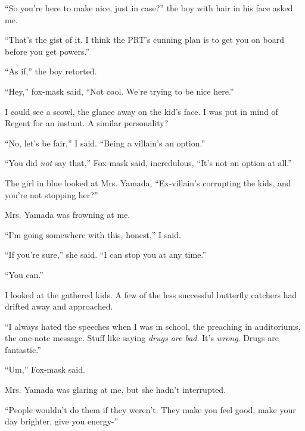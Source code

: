 ``So you're here to make nice, just in case?'' the boy with hair in his face asked me.



``That's the gist of it.  I think the PRT's cunning plan is to get you on board before you get powers.''



``As if,'' the boy retorted.



``Hey,'' fox-mask said, ``Not cool.  We're trying to be nice here.''



I could see a scowl, the glance away on the kid's face.  I was put in mind of Regent for an instant.  A similar personality?



``No, let's be fair,'' I said.  ``Being a villain's an option.''



``You did\emph{ not }say that,'' Fox-mask said, incredulous, ``It's not an option at all.''



The girl in blue looked at Mrs. Yamada, ``Ex-villain's corrupting the kids, and you're not stopping her?''



Mrs. Yamada was frowning at me.



``I'm going somewhere with this, honest,'' I said.



``If you're sure,'' she said.  ``I can stop you at any time.''



``You can.''



I looked at the gathered kids.  A few of the less successful butterfly catchers had drifted away and approached.



``I always hated the speeches when I was in school, the preaching in auditoriums, the one-note message.  Stuff like saying \emph{drugs are bad}.  It's \emph{wrong}.  Drugs are fantastic.''



``Um,'' Fox-mask said.



Mrs. Yamada was glaring at me, but she hadn't interrupted.



``People wouldn't do them if they weren't.  They make you feel good, make your day brighter, give you energy-''



